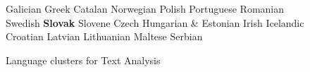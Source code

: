 \begin{multicols}{2}
\begin{figure}[htb]
\begin{tabular}
  Galician \newline 
  Greek \newline 
  Catalan \newline 
  Norwegian \newline 
  Polish \newline 
  Portuguese \newline 
  Romanian \newline 
  Swedish \newline 
  \textbf{Slovak} \newline 
  Slovene \newline 
  Czech \newline 
  Hungarian \newline 
& \vspace*{0.5mm}Estonian \newline 
  Irish \newline 
  Icelandic \newline 
  Croatian \newline 
  Latvian \newline 
  Lithuanian \newline 
  Maltese \newline 
  Serbian \\
  \end{tabular}
\label{fig:text_cluster_en}
\caption{Language clusters for Text Analysis}
\end{figure}
  

\end{multicols}
